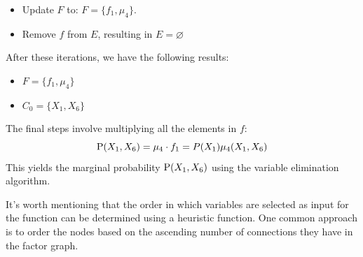 \begin{example}
\begin{itemize}
\begin{itemize}
                \item Update $F$ to: $F=\{f_1,\mu_4\}$. 
                \item Remove $f$ from $E$, resulting in $E=\varnothing$
            \end{itemize}
    \end{itemize}
    After these iterations, we have the following results:
    \begin{itemize}
        \item $F=\{f_1,\mu_4\}$
        \item $C_0=\{X_1,X_6\}$
    \end{itemize}
    The final steps involve multiplying all the elements in $f$: 
    \[\textnormal{P}(X_1,X_6)=\mu_4 \cdot f_1=P(X_1)\mu_4(X_1,X_6)\]
    This yields the marginal probability $\textnormal{P}(X_1,X_6)$ using the variable elimination algorithm.
\end{example}
It's worth mentioning that the order in which variables are selected as input for the function can be determined using a heuristic function. 
One common approach is to order the nodes based on the ascending number of connections they have in the factor graph.
